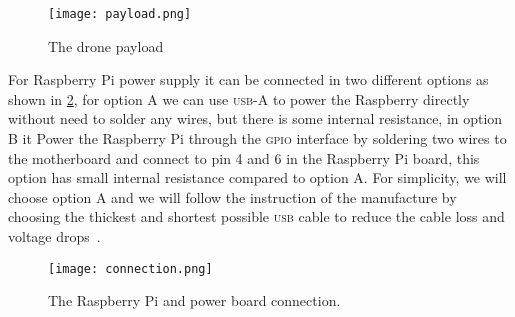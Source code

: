 \documentclass[../main.tex]{subfiles}
\begin{document}
\begin{figure}[tbp]
	\centering
	\texttt{[image: payload.png]}
	\caption{The drone payload}
	\label{fig:payload}
\end{figure} 

For Raspberry Pi power supply it can be connected in 
two different options as shown in \cref{fig:connection}, 
for option A we can use \textsc{usb}-\textsc{A} to power the Raspberry directly without
need to solder any wires,
but there is some internal resistance,
in option B it Power the Raspberry Pi through the \textsc{gpio} 
interface by soldering two wires to the motherboard and 
connect to pin 4 and 6 in the Raspberry Pi board,
this option has small internal resistance compared to option A.
For simplicity, we will choose option A and we will 
follow the instruction of the manufacture by choosing 
the thickest and shortest possible \textsc{usb} cable to reduce 
the cable loss and voltage drops~\cite{makerfocus}. 	 
 
 \begin{figure}[tbp]
 	\centering
 	\texttt{[image: connection.png]}
 	\caption{The Raspberry Pi and power board connection.}
 	\label{fig:connection}
 \end{figure}   
\end{document}
